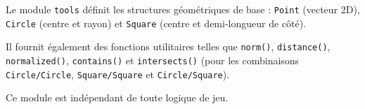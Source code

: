 \documentclass[10pt,a4paper]{article}
\begin{document}
\begin{list}{}{\leftmargin=0.5cm \rightmargin=0cm}
\item
Le module \texttt{tools} définit les structures géométriques de base : \texttt{Point} (vecteur 2D), \texttt{Circle} (centre et rayon) et \texttt{Square} (centre et demi-longueur de côté).

Il fournit également des fonctions utilitaires telles que \texttt{norm()}, \texttt{distance()}, \texttt{normalized()}, \texttt{contains()} et \texttt{intersects()} (pour les combinaisons \texttt{Circle/Circle}, \texttt{Square/Square} et \texttt{Circle/Square}).

Ce module est indépendant de toute logique de jeu.
\end{list}
\end{document}
